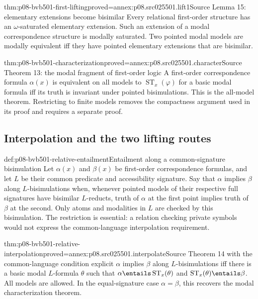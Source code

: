 \begin{hbtheorem}{thm:p08-bvb501-first-lifting}{proved=annex:p08.src025501.lift1}{Source Lemma 15: elementary extensions become bisimilar}
Every relational first-order structure has an \(\omega\)-saturated
elementary extension. Such an extension of a modal correspondence structure
is modally saturated. Two pointed modal models are modally equivalent iff
they have pointed elementary extensions that are bisimilar.
\end{hbtheorem}

\begin{hbtheorem}{thm:p08-bvb501-characterization}{proved=annex:p08.src025501.character}{Source Theorem 13: the modal fragment of first-order logic}
A first-order correspondence formula \(\alpha(x)\) is equivalent on
all models to \(\operatorname{ST}_x(\varphi)\) for a basic modal
formula iff its truth is invariant under pointed bisimulations.
This is the all-model theorem. Restricting to finite models removes the
compactness argument used in its proof and requires a separate proof.
\end{hbtheorem}

\subsection{Interpolation and the two lifting routes}
\label{sec:p08-bvb501-interpolation}

\begin{hbdefinition}{def:p08-bvb501-relative-entailment}{Entailment along a common-signature bisimulation}
Let \(\alpha(x)\) and \(\beta(x)\) be first-order correspondence
formulas, and let \(L\) be their common predicate and accessibility
signature. Say that \(\alpha\) implies \(\beta\) along
\(L\)-bisimulations when, whenever pointed models of their respective
full signatures have bisimilar \(L\)-reducts, truth of \(\alpha\)
at the first point implies truth of \(\beta\) at the second.
Only atoms and modalities in \(L\) are checked by this bisimulation.
The restriction is essential: a relation checking private symbols would
not express the common-language interpolation requirement.
\end{hbdefinition}

\begin{hbtheorem}{thm:p08-bvb501-relative-interpolation}{proved=annex:p08.src025501.interpolate}{Source Theorem 14 with the common-language condition explicit}
\(\alpha\) implies \(\beta\) along \(L\)-bisimulations iff
there is a basic modal \(L\)-formula \(\theta\) such that
\(\alpha\entails\operatorname{ST}_x(\theta)\) and
\(\operatorname{ST}_x(\theta)\entails\beta\).
All models are allowed. In the equal-signature case \(\alpha=\beta\),
this recovers the modal characterization theorem.
\end{hbtheorem}

